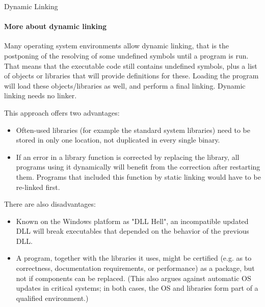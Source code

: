 \begin{frame}{Dynamic Linking}
  \centering
  \mode<beamer>{ \texttt{[image: dynamic-linking2]} }%
\end{frame}

\paragraph{More about dynamic linking}

Many operating system environments allow dynamic linking, that is the postponing of the
resolving of some undefined symbols until a program is run. That means that the executable
code still contains undefined symbols, plus a list of objects or libraries that will
provide definitions for these. Loading the program will load these objects/libraries as
well, and perform a final linking. Dynamic linking needs no linker.

This approach offers two advantages:
\begin{itemize}
\item Often-used libraries (for example the standard system libraries) need to be stored
  in only one location, not duplicated in every single binary.
\item If an error in a library function is corrected by replacing the library, all
  programs using it dynamically will benefit from the correction after restarting
  them. Programs that included this function by static linking would have to be re-linked
  first.
\end{itemize}

There are also disadvantages:
\begin{itemize}
\item Known on the Windows platform as "DLL Hell", an incompatible updated DLL will break
  executables that depended on the behavior of the previous DLL.
\item A program, together with the libraries it uses, might be certified (e.g. as to
  correctness, documentation requirements, or performance) as a package, but not if
  components can be replaced. (This also argues against automatic OS updates in critical
  systems; in both cases, the OS and libraries form part of a qualified environment.)
\end{itemize}


